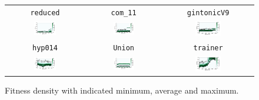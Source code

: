 \documentclass[11pt,a4paper]{scrartcl}
\begin{document}
\begin{figure}[H]
\center
\begin{tabular}{ccc}
\texttt{reduced} & \texttt{com\_11} & \texttt{gintonicV9} \\
\includegraphics[width=0.3\textwidth]{img/self_adapt_2_reduced.png} &
\includegraphics[width=0.3\textwidth]{img/self_adapt_2_com_11.png} &
\includegraphics[width=0.3\textwidth]{img/self_adapt_2_gintonicV9.png} \\
\texttt{hyp014} & \texttt{Union} & \texttt{trainer} \\
\includegraphics[width=0.3\textwidth]{img/self_adapt_2_hyp014.png} &
\includegraphics[width=0.3\textwidth]{img/self_adapt_2_Union.png} &
\includegraphics[width=0.3\textwidth]{img/self_adapt_2_trainer.png}
\end{tabular}
\caption{Fitness density with indicated minimum, average and maximum.}
\label{fig:self_adapt_2}
\end{figure}
\end{document}
